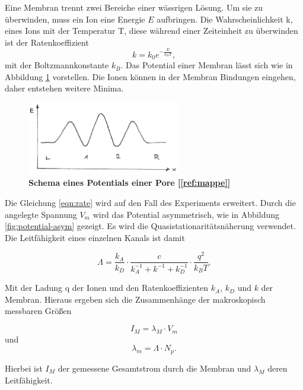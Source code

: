 \documentclass[a4paper,ngerman]{scrartcl}
\begin{document}
Eine Membran trennt zwei Bereiche einer wässrigen Lösung. Um sie zu überwinden, muss ein Ion eine Energie $E$ aufbringen. Die  Wahrscheinlichkeit k, eines Ions mit der Temperatur T, diese während einer Zeiteinheit zu überwinden ist der Ratenkoeffizient
\begin{equation} \label{eqn:rate}
k = k_0 e^{-\frac{E}{k_B T}},
\end{equation}
mit der Boltzmannkonstante $k_{B}$. Das Potential einer Membran lässt sich wie in Abbildung \ref{fig:potential-einfach} vorstellen. Die Ionen können in der Membran Bindungen eingehen, daher entstehen weitere Minima.

\begin{figure}[tb!]
\includegraphics[width=0.6\textwidth]{abbildungen/potential-einfach.png}
\caption{\textbf{Schema eines Potentials einer Pore [\ref{ref:mappe}]}}
\label{fig:potential-einfach}
\end{figure}


Die Gleichung \ref{eqn:rate} wird auf den Fall des Experiments erweitert. Durch die angelegte Spannung $V_{m}$ wird das Potential asymmetrisch, wie in Abbildung \ref{fig:potential-asym} gezeigt.  Es wird die Quasistationaritätsnäherung verwendet. Die Leitfähigkeit eines einzelnen Kanals ist damit

\begin{equation}
\Lambda = \frac{k_A}{k_D} \cdot \frac{c}{k_A^{-1}+k^{-1}+k_D^{-1}} \cdot  \frac{q^2}{k_B T} .
\end{equation}

Mit der Ladung q der Ionen und den Ratenkoeffizienten $k_A$, $k_D$ und $k$ der Membran.
Hieraus ergeben sich die Zusammenhänge der makroskopisch messbaren Größen

\begin{equation}
I_M = \lambda_M \cdot V_m
\end{equation}
und
\begin{equation}\label{eqn:transport-leitfaehigkeit}
\lambda_m = \Lambda \cdot N_p.
\end{equation}

Hierbei ist $I_M$ der gemessene Gesamtstrom durch die Membran und $\lambda_M$ deren Leitfähigkeit.
\end{document}
